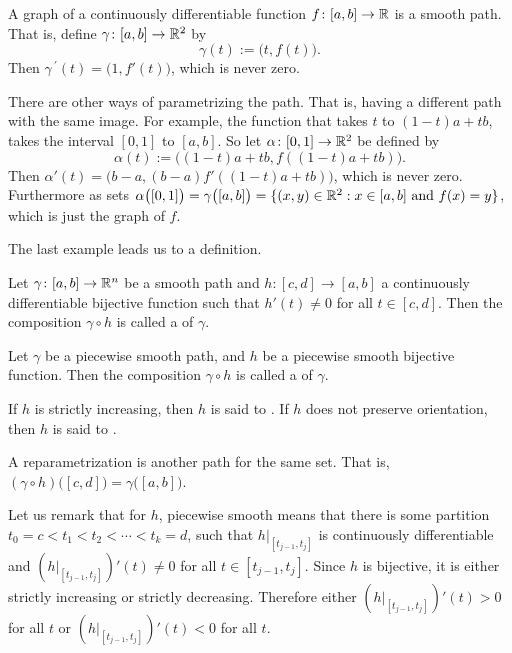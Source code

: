 \begin{example}
A graph of a continuously differentiable function $f \colon [a,b] \to {\mathbb{R}}$ is a smooth path.
That is, define $\gamma \colon [a,b] \to {\mathbb{R}}^2$ by
\begin{equation*}
\gamma(t) := \bigl(t,f(t)\bigr) .
\end{equation*}
Then $\gamma^{\:\prime}(t) = \bigl( 1 , f'(t) \bigr)$, which is never zero.

There are other ways of parametrizing the path.  That is, having a
different path with the same image.  For example,
the function that takes $t$ to 
$(1-t)a+tb$, takes the interval $[0,1]$ to $[a,b]$.  So let
$\alpha \colon [0,1] \to {\mathbb{R}}^2$ be defined by
\begin{equation*}
\alpha(t) := \bigl((1-t)a+tb,f((1-t)a+tb)\bigr) .
\end{equation*}
Then
$\alpha'(t) = \bigl( b-a , (b-a)f'((1-t)a+tb) \bigr)$, which is never zero.
Furthermore as sets $\alpha\bigl([0,1]\bigr) = \gamma\bigl([a,b]\bigr)
= \{ (x,y) \in {\mathbb{R}}^2 : x \in [a,b] \text{ and } f(x) = y \}$,
which is just the graph of $f$.
\end{example}

The last example leads us to a definition.

\begin{defn}
Let $\gamma \colon [a,b] \to {\mathbb{R}}^n$ be a smooth path and
$h \colon [c,d] \to [a,b]$ a continuously differentiable bijective function
such that $h'(t) \not= 0$ for all $t \in [c,d]$.  Then
the composition
$\gamma \circ h$ is called a
\emph{}
of $\gamma$.

Let $\gamma$ be a piecewise smooth path,
and $h$ be a piecewise smooth bijective function.  Then
the composition
$\gamma \circ h$ is called a
\emph{} of $\gamma$.

If $h$ is strictly increasing, then $h$ is 
said to \emph{}.  If $h$ does not preserve
orientation, then $h$ is said to \emph{}.
\end{defn}

A reparametrization is another path for the same set.  That is,
$(\gamma \circ h)\bigl([c,d]\bigr) =
\gamma \bigl([a,b]\bigr)$.

Let us remark that for $h$, piecewise smooth means that there is
some partition $t_0 = c < t_1 < t_2 < \cdots < t_k = d$,
such that $h|_{[t_{j-1},t_j]}$ is continuously differentiable
and $(h|_{[t_{j-1},t_j]})'(t) \not= 0$ for all $t \in [t_{j-1},t_j]$.
Since $h$ is bijective, it is either strictly increasing or
strictly decreasing.  Therefore either $(h|_{[t_{j-1},t_j]})'(t) > 0$
for all $t$ or $(h|_{[t_{j-1},t_j]})'(t) < 0$ for all $t$.

